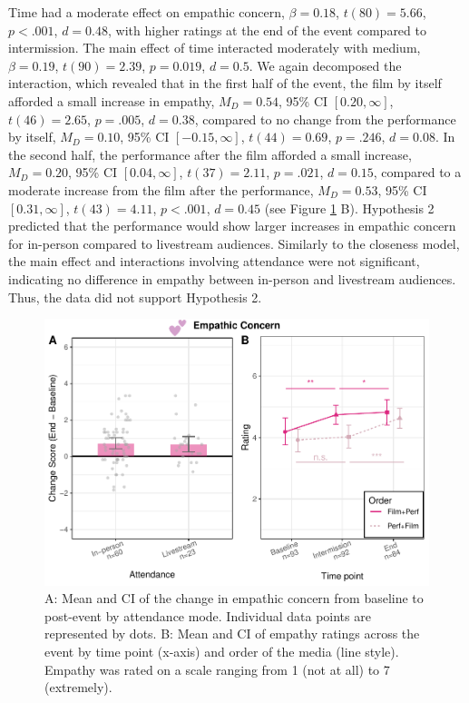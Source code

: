 \documentclass[
  man,floatsintext]{apa6}
\begin{document}
Time had a moderate effect on empathic concern, \(\beta = 0.18\), \(t (80) = 5.66\), \(p < .001\), \(d = 0.48\), with higher ratings at the end of the event compared to intermission. The main effect of time interacted moderately with medium, \(\beta = 0.19\), \(t (90) = 2.39\), \(p = 0.019\), \(d = 0.5\). We again decomposed the interaction, which revealed that in the first half of the event, the film by itself afforded a small increase in empathy, \(M_D = 0.54\), 95\% CI \([0.20, \infty]\), \(t(46) = 2.65\), \(p = .005\), \(d = 0.38\), compared to no change from the performance by itself, \(M_D = 0.10\), 95\% CI \([-0.15, \infty]\), \(t(44) = 0.69\), \(p = .246\), \(d = 0.08\). In the second half, the performance after the film afforded a small increase, \(M_D = 0.20\), 95\% CI \([0.04, \infty]\), \(t(37) = 2.11\), \(p = .021\), \(d = 0.15\), compared to a moderate increase from the film after the performance, \(M_D = 0.53\), 95\% CI \([0.31, \infty]\), \(t(43) = 4.11\), \(p < .001\), \(d = 0.45\) (see Figure \ref{fig:empathy-plots} B). Hypothesis 2 predicted that the performance would show larger increases in empathic concern for in-person compared to livestream audiences. Similarly to the closeness model, the main effect and interactions involving attendance were not significant, indicating no difference in empathy between in-person and livestream audiences. Thus, the data did not support Hypothesis 2.



\begin{figure}
\includegraphics[width=1\linewidth]{Schlichting_MSc_Thesis_files/figure-latex/empathy-plots-1} \caption{A: Mean and CI of the change in empathic concern from baseline to post-event by attendance mode. Individual data points are represented by dots. B: Mean and CI of empathy ratings across the event by time point (x-axis) and order of the media (line style). Empathy was rated on a scale ranging from 1 (not at all) to 7 (extremely).}\label{fig:empathy-plots}
\end{figure}
\end{document}
